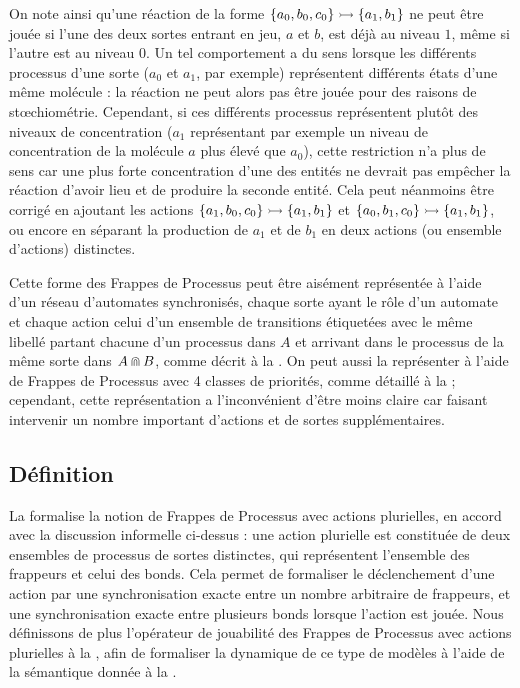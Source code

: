 On note ainsi qu'une réaction de la forme $\mbox{$\{ a_0, b_0, c_0 \} \rightarrowtail \{ a_1, b_1 \}$}$
ne peut être jouée si l'une des deux sortes entrant en jeu, $a$ et $b$, est déjà au niveau $1$,
même si l'autre est au niveau $0$.
Un tel comportement a du sens lorsque les différents processus d'une sorte
($a_0$ et $a_1$, par exemple)
représentent différents états d'une même molécule :
la réaction ne peut alors pas être jouée pour des raisons de stœchiométrie.
Cependant, si ces différents processus représentent plutôt des niveaux de concentration
($a_1$ représentant par exemple un niveau de concentration de la molécule $a$ plus élevé que $a_0$),
cette restriction n'a plus de sens car une plus forte concentration d'une des entités
ne devrait pas empêcher la réaction d'avoir lieu et de produire la seconde entité.
Cela peut néanmoins être corrigé en ajoutant les actions
$\mbox{$\{ a_1, b_0, c_0 \} \rightarrowtail \{ a_1, b_1 \}$}$ et
$\mbox{$\{ a_0, b_1, c_0 \} \rightarrowtail \{ a_1, b_1 \}$}$,
ou encore en séparant la production de $a_1$ et de $b_1$ en deux actions (ou ensemble d'actions)
distinctes.

Cette forme des Frappes de Processus peut être aisément représentée à l'aide d'un réseau
d'automates synchronisés, chaque sorte ayant le rôle d'un automate et chaque action celui d'un
ensemble de transitions étiquetées avec le même libellé partant chacune d'un processus dans $A$ et
arrivant dans le processus de la même sorte dans $A \Cap B$,
comme décrit à la .
On peut aussi la représenter à l'aide de Frappes de Processus avec 4 classes de priorités,
comme détaillé à la  ;
cependant, cette représentation a l'inconvénient d'être moins claire car faisant intervenir
un nombre important d'actions et de sortes supplémentaires.




\subsection{Définition}

La  formalise la notion de Frappes de Processus avec actions plurielles,
en accord avec la discussion informelle ci-dessus :
une action plurielle est constituée de deux ensembles de processus de sortes distinctes,
qui représentent l'ensemble des frappeurs et celui des bonds.
Cela permet de formaliser le déclenchement d'une action par une synchronisation exacte
entre un nombre arbitraire de frappeurs,
et une synchronisation exacte entre plusieurs bonds lorsque l'action est jouée.
Nous définissons de plus l'opérateur de jouabilité
des Frappes de Processus avec actions plurielles
à la ,
afin de formaliser la dynamique de ce type de modèles
à l'aide de la sémantique donnée à la .

